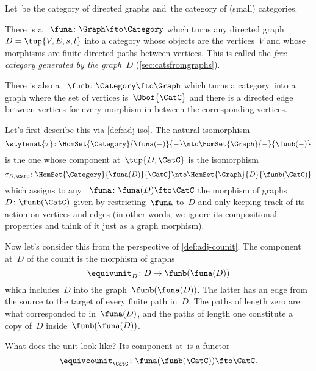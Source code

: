 \begin{example}
Let~\Graph be the category of directed graphs and~\Category the category of (small) categories.

There is a ~$\funa \colon \Graph \fto \Category$ which turns any directed graph~$D = \tup{V,E, s,t}$ into a category whose objects are the vertices~$V$ and whose morphisms are finite directed paths between vertices.
This is called the \emph{free category generated by the graph~$D$} (\cref{sec:catsfromgraphs}).

There is also a ~$\funb \colon \Category \fto \Graph$ which turns a category~\CatC into a graph where the set of vertices is~$\Obof{\CatC}$ and there is a directed edge between vertices for every morphism in \CatC between the corresponding vertices.

Let's first describe this  via \cref{def:adj-iso}.
The natural isomorphism
\begin{equation}\label{eq:cat-graph-adjunction-transpose-iso}
    \stylenat{\tau}\colon \HomSet{\Category}{\funa(-)}{-} \nto \HomSet{\Graph}{-}{\funb(-)}
\end{equation}
is the one whose component at~$\tup{D,\CatC}$ is the isomorphism
\begin{equation}\label{eq:cat-graph-adjunction-transpose-iso-components}
    \tau_{D,\CatC} \colon \HomSet{\Category}{\funa(D)}{\CatC} \nto \HomSet{\Graph}{D}{\funb(\CatC)}
\end{equation}
which assigns to any ~$\funa\colon \funa(D) \fto \CatC$ the morphism of graphs~$D \colon \funb(\CatC)$ given by restricting~$\funa$ to~$D$ and only keeping track of its action on vertices and edges (in other words, we ignore its compositional properties and think of it just as a graph morphism).

Now let's consider this  from the perspective of \cref{def:adj-counit}.
The component at~$D$ of the counit is the morphism of graphs
\begin{equation}\label{eq:cat-graph-adjunction-unit}
    \equivunit_D \colon D \to \funb(\funa(D))
\end{equation}
which includes~$D$ into the graph~$\funb(\funa(D))$.
The latter has an edge from the source to the target of every finite path in~$D$.
The paths of length zero are what corresponded to  in~$\funa(D)$, and the paths of length one constitute a copy of~$D$ inside~$\funb(\funa(D))$.

What does the unit look like?
Its component at~\CatC is a functor
\begin{equation}\label{eq:cat-graph-adjunction-co-unit}
    \equivcounit_{\CatC} \colon \funa(\funb(\CatC)) \fto \CatC.
\end{equation}


\end{example}
